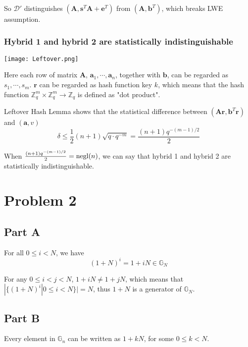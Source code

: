 \documentclass[8pt]{article}
\theoremstyle{compact}
\def\le{\leqslant}
\begin{document}
So $\mathcal D'$ distinguishes $(\mathbf A, \mathbf s^T\mathbf A + \mathbf e^T)$ from $(\mathbf A, \mathbf b^T)$, which breaks LWE assumption.

\subsubsection*{Hybrid 1 and hybrid 2 are statistically indistinguishable}

\begin{center}
	\begin{mdframed}

		\texttt{[image: Leftover.png]}
		
	\end{mdframed}
\end{center}

Here each row of matrix $\mathbf A$, $\mathbf a_1, \cdots, \mathbf a_n$, together with $\mathbf b$, can be regarded as $s_1, \cdots, s_m$. $\mathbf r$ can be regarded as hash function key $k$, which means that the hash function $\mathbb Z_q^m \times \mathbb Z_q^m \to \mathbb Z_q$ is defined as "dot product".

Leftover Hash Lemma shows that the statistical difference between $(\mathbf{Ar}, \mathbf{b}^T\mathbf{r})$ and $(\mathbf{a}, v)$ $$\delta \le \frac12(n+1)\sqrt{q \cdot q^{-m}} = \frac{(n+1)q^{-(m-1)/2}}{2}$$

When $\frac{(n+1)q^{-(m-1)/2}}{2} = \text{negl}(n)$, we can say that hybrid 1 and hybrid 2 are statistically indistinguishable.

\section*{Problem 2}
\subsection*{Part A}
For all $0 \le i < N$, we have $$(1 + N)^i = 1 + iN \in \mathbb G_N$$

For any $0 \le i < j < N$, $1 + iN \neq 1 + jN$, which means that $|\{(1 + N)^i | 0 \le i < N\}| = N$, thus $1 + N$ is a generator of $\mathbb G_N$.
\subsection*{Part B}
Every element in $\mathbb G_n$ can be written as $1 + kN$, for some $0 \le k < N$.
\end{document}
